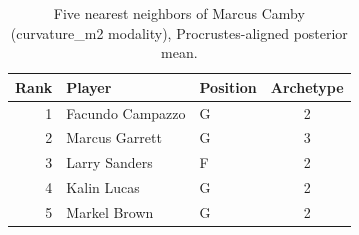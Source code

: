 \begin{table}[htbp]
  \centering\small
  \begin{tabular}{rllc}
    \toprule
    Rank & Player & Position & Archetype \\
    \midrule
    1 & Facundo Campazzo & G & 2 \\
    2 & Marcus Garrett & G & 3 \\
    3 & Larry Sanders & F & 2 \\
    4 & Kalin Lucas & G & 2 \\
    5 & Markel Brown & G & 2 \\
    \bottomrule
  \end{tabular}
  \caption{Five nearest neighbors of Marcus Camby (curvature_m2 modality), Procrustes-aligned posterior mean.}
  \label{tab:Marcus_Camby_neighbors_curvature_m2}
\end{table}

